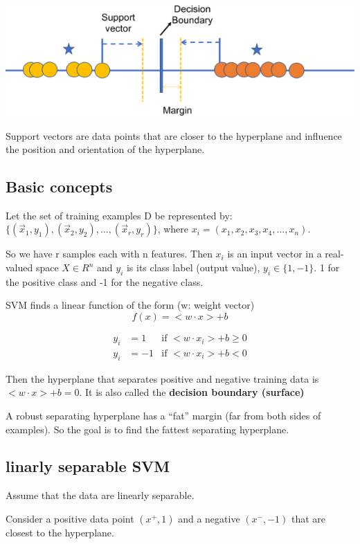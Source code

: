 \documentclass[letterpaper,12pt]{article}
\begin{document}
\includegraphics{./Image/SVM toy example.png}

Support vectors are data points that are closer to the hyperplane and influence
the position and orientation of the hyperplane.

\subsection{Basic concepts}

Let the set of training examples D be represented by:
$\{(\vec{x}_1,y_1),(\vec{x}_2,y_2),\ldots,(\vec{x}_r,y_r)\}$, where
$x_i=(x_1,x_2,x_3,x_4,\ldots,x_n)$.

So we have r samples each with n features. Then $x_i$ is an input vector in a
real-valued space $X\in R^n$ and $y_i$ is its class label (output value),
$y_i\in\{1,-1\}$. 1 for the positive class and -1 for the negative class.

SVM finds a linear function of the form (w: weight vector)
\[
    f(x)=<w \cdot x>+b
\]

\begin{align*}
    y_i & = 1  & \text{if }<w\cdot x_i> + b \ge 0 \\
    y_i & = -1 & \text{if } <w\cdot x_i> + b < 0
\end{align*}

Then the hyperplane that separates positive and negative training data is
$<w\cdot x> + b = 0$. It is also called the \textbf{decision boundary
    (surface)}

A robust separating hyperplane has a ``fat'' margin (far from both sides of
examples). So the goal is to find the fattest separating hyperplane.

\subsection{linarly separable SVM}
Assume that the data are linearly separable.

Consider a positive data point $(x^+,1)$ and a negative $(x^-,-1)$ that are
closest to the hyperplane.
\end{document}
